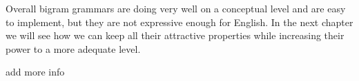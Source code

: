 Overall bigram grammars are doing very well on a conceptual level and are easy to implement, but they are not expressive enough for English.
In the next chapter we will see how we can keep all their attractive properties while increasing their power to a more adequate level.



\begin{literature}
add more info
\end{literature}
